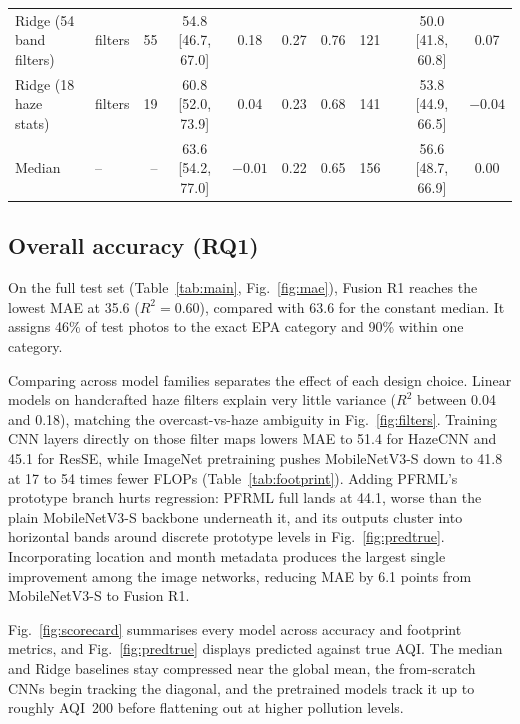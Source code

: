 \documentclass[conference]{IEEEtran}
\begin{document}
\begin{table}[!t]
\begin{tabular}{llrcccccccc}
    Ridge (54 band filters) & filters           &      55 &     54.8 [46.7, 67.0]      &     0.18      &     0.27      &     0.76      &     121     &  &     50.0 [41.8, 60.8]      &     0.07      \\
    Ridge (18 haze stats)   & filters           &      19 &     60.8 [52.0, 73.9]      &     0.04      &     0.23      &     0.68      &     141     &  &     53.8 [44.9, 66.5]      &    $-0.04$    \\
    Median                  & --                &      -- &     63.6 [54.2, 77.0]      &    $-0.01$    &     0.22      &     0.65      &     156     &  &     56.6 [48.7, 66.9]      &    $0.00$     \\
    \bottomrule
  \end{tabular}
\end{table}

\subsection{Overall accuracy (RQ1)}

On the full test set (Table~\ref{tab:main}, Fig.~\ref{fig:mae}), Fusion R1
reaches the lowest MAE at 35.6 ($R^2 = 0.60$), compared with 63.6 for the
constant median. It assigns 46\% of test photos to the exact EPA category and
90\% within one category.

Comparing across model families separates the effect of each design choice.
Linear models on handcrafted haze filters explain very little variance ($R^2$
between 0.04 and 0.18), matching the overcast-vs-haze ambiguity in
Fig.~\ref{fig:filters}. Training CNN layers directly on those filter maps lowers
MAE to 51.4 for HazeCNN and 45.1 for ResSE, while ImageNet pretraining pushes
MobileNetV3-S down to 41.8 at 17 to 54 times fewer FLOPs
(Table~\ref{tab:footprint}). Adding PFRML's prototype branch hurts regression:
PFRML full lands at 44.1, worse than the plain MobileNetV3-S backbone underneath
it, and its outputs cluster into horizontal bands around discrete prototype
levels in Fig.~\ref{fig:predtrue}. Incorporating location and month metadata
produces the largest single improvement among the image networks, reducing MAE
by 6.1 points from MobileNetV3-S to Fusion R1.

Fig.~\ref{fig:scorecard} summarises every model across accuracy and footprint
metrics, and Fig.~\ref{fig:predtrue} displays predicted against true AQI. The
median and Ridge baselines stay compressed near the global mean, the
from-scratch CNNs begin tracking the diagonal, and the pretrained models track
it up to roughly AQI~200 before flattening out at higher pollution levels.
\end{document}
